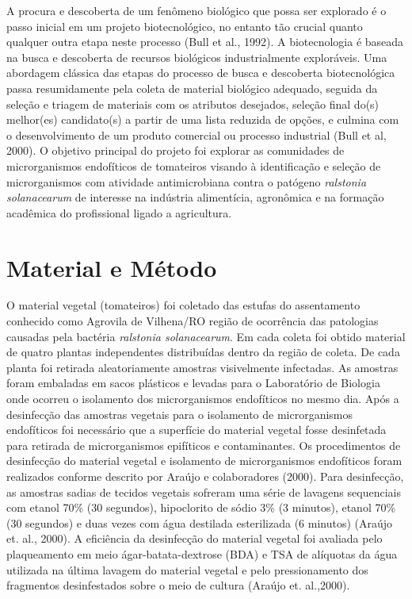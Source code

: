 \documentclass[article,12pt,onesidea,4paper,english,brazil]{abntex2}
\begin{document}
A procura e descoberta de um fenômeno biológico que possa ser explorado é o passo inicial em um projeto biotecnológico, no entanto tão crucial quanto qualquer outra etapa neste processo (Bull et al., 1992). A biotecnologia é baseada na busca e descoberta de recursos biológicos industrialmente exploráveis. Uma abordagem clássica das etapas do processo de busca e descoberta biotecnológica passa resumidamente pela coleta de material biológico adequado, seguida da seleção e triagem de materiais com os atributos desejados, seleção final do(s) melhor(es) candidato(s) a partir de uma lista reduzida de opções, e culmina com o desenvolvimento de um produto comercial ou processo industrial (Bull et al, 2000). O objetivo principal do projeto foi explorar as comunidades de microrganismos endofíticos de tomateiros visando à identificação e seleção de microrganismos com atividade antimicrobiana contra o patógeno \textit{ralstonia solanacearum} de interesse na indústria alimentícia, agronômica e na formação acadêmica do profissional ligado a agricultura.
	
	\section*{Material e Método}
	
O material vegetal (tomateiros) foi coletado das estufas do assentamento conhecido como Agrovila de Vilhena/RO região de ocorrência das patologias causadas pela bactéria \textit{ralstonia solanacearum}.  Em cada coleta foi obtido material de quatro plantas independentes distribuídas dentro da região de coleta. De cada planta foi retirada aleatoriamente amostras visivelmente infectadas. As amostras foram embaladas em sacos plásticos e levadas para o Laboratório de Biologia onde ocorreu o isolamento dos microrganismos endofíticos no mesmo dia. Após a desinfecção das amostras vegetais para o isolamento de microrganismos endofíticos foi necessário que a superfície do material vegetal fosse desinfetada para retirada de microrganismos epifíticos e contaminantes. Os procedimentos de desinfecção do material vegetal e isolamento de microrganismos endofíticos foram realizados conforme descrito por Araújo e colaboradores (2000). Para desinfecção, as amostras sadias de tecidos vegetais sofreram uma série de lavagens sequenciais com etanol 70\% (30 segundos), hipoclorito de sódio 3\% (3 minutos), etanol 70\% (30 segundos) e duas vezes com água destilada esterilizada (6 minutos) (Araújo et. al., 2000). A eficiência da desinfecção do material vegetal foi avaliada pelo plaqueamento em meio ágar-batata-dextrose (BDA) e TSA de alíquotas da água utilizada na última lavagem do material vegetal e pelo pressionamento dos fragmentos desinfestados sobre o meio de cultura (Araújo et. al.,2000).
\end{document}
